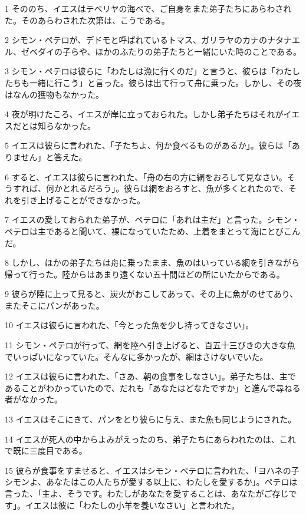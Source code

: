 \par 1 そののち、イエスはテベリヤの海べで、ご自身をまた弟子たちにあらわされた。そのあらわされた次第は、こうである。
\par 2 シモン・ペテロが、デドモと呼ばれているトマス、ガリラヤのカナのナタナエル、ゼベダイの子らや、ほかのふたりの弟子たちと一緒にいた時のことである。
\par 3 シモン・ペテロは彼らに「わたしは漁に行くのだ」と言うと、彼らは「わたしたちも一緒に行こう」と言った。彼らは出て行って舟に乗った。しかし、その夜はなんの獲物もなかった。
\par 4 夜が明けたころ、イエスが岸に立っておられた。しかし弟子たちはそれがイエスだとは知らなかった。
\par 5 イエスは彼らに言われた、「子たちよ、何か食べるものがあるか」。彼らは「ありません」と答えた。
\par 6 すると、イエスは彼らに言われた、「舟の右の方に網をおろして見なさい。そうすれば、何かとれるだろう」。彼らは網をおろすと、魚が多くとれたので、それを引き上げることができなかった。
\par 7 イエスの愛しておられた弟子が、ペテロに「あれは主だ」と言った。シモン・ペテロは主であると聞いて、裸になっていたため、上着をまとって海にとびこんだ。
\par 8 しかし、ほかの弟子たちは舟に乗ったまま、魚のはいっている網を引きながら帰って行った。陸からはあまり遠くない五十間ほどの所にいたからである。
\par 9 彼らが陸に上って見ると、炭火がおこしてあって、その上に魚がのせてあり、またそこにパンがあった。
\par 10 イエスは彼らに言われた、「今とった魚を少し持ってきなさい」。
\par 11 シモン・ペテロが行って、網を陸へ引き上げると、百五十三びきの大きな魚でいっぱいになっていた。そんなに多かったが、網はさけないでいた。
\par 12 イエスは彼らに言われた、「さあ、朝の食事をしなさい」。弟子たちは、主であることがわかっていたので、だれも「あなたはどなたですか」と進んで尋ねる者がなかった。
\par 13 イエスはそこにきて、パンをとり彼らに与え、また魚も同じようにされた。
\par 14 イエスが死人の中からよみがえったのち、弟子たちにあらわれたのは、これで既に三度目である。
\par 15 彼らが食事をすませると、イエスはシモン・ペテロに言われた、「ヨハネの子シモンよ、あなたはこの人たちが愛する以上に、わたしを愛するか」。ペテロは言った、「主よ、そうです。わたしがあなたを愛することは、あなたがご存じです」。イエスは彼に「わたしの小羊を養いなさい」と言われた。
